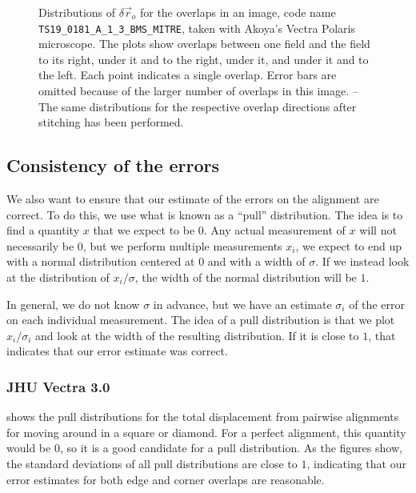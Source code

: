 \documentclass{article}
\begin{document}
\begin{figure}[ht]
\begin{subfigure}{0.24\linewidth}
		\caption{}
		\label{fig:stitchresultAKY1}
	\end{subfigure}
	\caption{Distributions of $\delta\vec{r}_o$ for the overlaps in an image, code name \texttt{TS19\_0181\_A\_1\_3\_BMS\_MITRE}, taken with Akoya's Vectra Polaris microscope.  The plots show overlaps between one field and the field  to its right,  under it and to the right,  under it, and  under it and to the left.  Each point indicates a single overlap.  Error bars are omitted because of the larger number of overlaps in this image.  -- The same distributions for the respective overlap directions after stitching has been performed.}
	\label{fig:alignmentresultsAKY}
\end{figure}

\clearpage

\subsection{Consistency of the errors}
\label{sec:pulls}

We also want to ensure that our estimate of the errors on the alignment are correct.  To do this, we use what is known as a ``pull'' distribution.  The idea is to find a quantity $x$ that we expect to be $0$.  Any actual measurement of $x$ will not necessarily be $0$, but we perform multiple measurements $x_i$, we expect to end up with a normal distribution centered at $0$ and with a width of $\sigma$.  If we instead look at the distribution of $x_i/\sigma$, the width of the normal distribution will be $1$.

In general, we do not know $\sigma$ in advance, but we have an estimate $\sigma_i$ of the error on each individual measurement.  The idea of a pull distribution is that we plot $x_i/\sigma_i$ and look at the width of the resulting distribution.  If it is close to $1$, that indicates that our error estimate was correct.

\subsubsection{JHU Vectra 3.0}

 shows the pull distributions for the total displacement from pairwise alignments for moving around in a square or diamond.  For a perfect alignment, this quantity would be $0$, so it is a good candidate for a pull distribution.  As the figures show, the standard deviations of all pull distributions are close to $1$, indicating that our error estimates for both edge and corner overlaps are reasonable.
\end{document}
